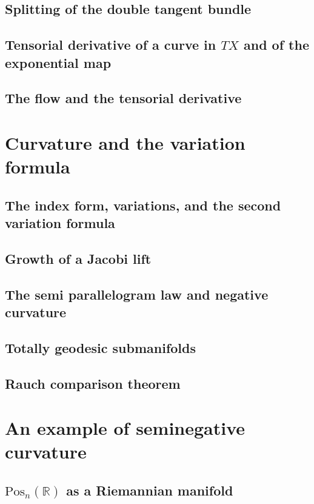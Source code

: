 \documentclass[a4paper]{article}
\newcommand{\R}{\mathbb{R}}
\begin{document}
\subsection{Splitting of the double tangent bundle}

\subsection{Tensorial derivative of a curve in $TX$ and of the exponential map}

\subsection{The flow and the tensorial derivative}

\section{Curvature and the variation formula}

\subsection{The index form, variations, and the second variation formula}

\subsection{Growth of a Jacobi lift}

\subsection{The semi parallelogram law and negative curvature}

\subsection{Totally geodesic submanifolds}

\subsection{Rauch comparison theorem}

\section{An example of seminegative curvature}

\subsection{$\text{Pos}_n(\R)$ as a Riemannian manifold}
\end{document}
